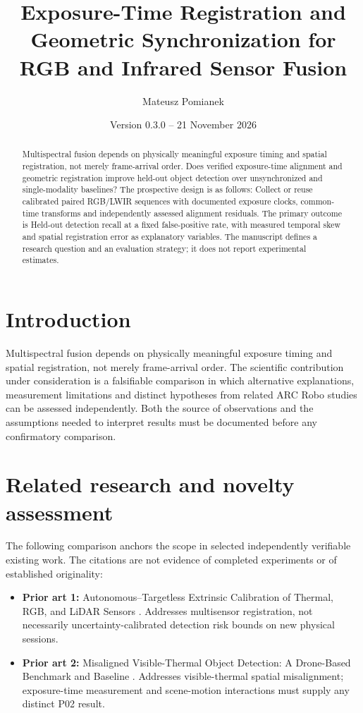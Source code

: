 \documentclass[11pt,a4paper]{article}
\title{Exposure-Time Registration and Geometric Synchronization for RGB and Infrared Sensor Fusion}
\author{Mateusz Pomianek}
\date{Version 0.3.0 -- 21 November 2026}
\begin{document}
\maketitle

\begin{abstract}
Multispectral fusion depends on physically meaningful exposure timing and spatial registration, not merely frame-arrival order. Does verified exposure-time alignment and geometric registration improve held-out object detection over unsynchronized and single-modality baselines? The prospective design is as follows: Collect or reuse calibrated paired RGB/LWIR sequences with documented exposure clocks, common-time transforms and independently assessed alignment residuals. The primary outcome is Held-out detection recall at a fixed false-positive rate, with measured temporal skew and spatial registration error as explanatory variables. The manuscript defines a research question and an evaluation strategy; it does not report experimental estimates.
\end{abstract}

\section{Introduction}
Multispectral fusion depends on physically meaningful exposure timing and spatial registration, not merely frame-arrival order. The scientific contribution under consideration is a falsifiable comparison in which alternative explanations, measurement limitations and distinct hypotheses from related ARC Robo studies can be assessed independently. Both the source of observations and the assumptions needed to interpret results must be documented before any confirmatory comparison.

\section{Related research and novelty assessment}
The following comparison anchors the scope in selected independently verifiable existing work. The citations are not evidence of completed experiments or of established originality:
\begin{itemize}
\item \textbf{Prior art 1:} Autonomous--Targetless Extrinsic Calibration of Thermal, RGB, and LiDAR Sensors \cite{source1}. Addresses multisensor registration, not necessarily uncertainty-calibrated detection risk bounds on new physical sessions.
\item \textbf{Prior art 2:} Misaligned Visible-Thermal Object Detection: A Drone-Based Benchmark and Baseline \cite{source2}. Addresses visible-thermal spatial misalignment; exposure-time measurement and scene-motion interactions must supply any distinct P02 result.
\end{itemize}
\end{document}

